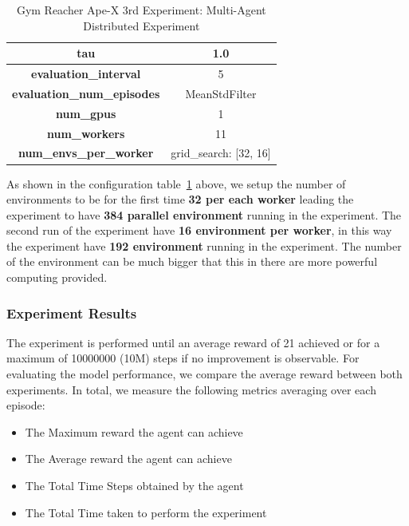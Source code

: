 \begin{table}[!htb]
\begin{tabular}{|c|l|l|c|l|l|}
		\multicolumn{3}{|c|}{\textbf{tau}}                                            & \multicolumn{3}{c|}{1.0}                                                             \\ \hline
		\multicolumn{3}{|c|}{\textbf{evaluation\_interval}}                           & \multicolumn{3}{c|}{5}                                                               \\ \hline
		\multicolumn{3}{|c|}{\textbf{evaluation\_num\_episodes}}                      & \multicolumn{3}{c|}{MeanStdFilter}                                                   \\ \hline
		\multicolumn{3}{|c|}{\cellcolor[HTML]{C0C0C0}\textbf{num\_gpus}}              & \multicolumn{3}{c|}{\cellcolor[HTML]{C0C0C0}1}                                       \\ \hline
		\multicolumn{3}{|c|}{\cellcolor[HTML]{C0C0C0}\textbf{num\_workers}}           & \multicolumn{3}{c|}{\cellcolor[HTML]{C0C0C0}11}                                      \\ \hline
		\multicolumn{3}{|c|}{\cellcolor[HTML]{C0C0C0}\textbf{num\_envs\_per\_worker}} & \multicolumn{3}{c|}{\cellcolor[HTML]{C0C0C0}grid\_search: [32, 16]}                  \\ \hline
	\end{tabular}
	\caption{Gym Reacher Ape-X 3rd Experiment: Multi-Agent Distributed Experiment}
	\label{tab:gym_reacher_apex_3rd_exp}
\end{table}

As shown in the configuration table~\ref{tab:gym_reacher_apex_3rd_exp} above, we setup the number of environments to be for the first time \textbf{32 per each worker} leading the experiment to have \textbf{384 parallel environment} running in the experiment. The second run of the experiment have \textbf{16 environment per worker}, in this way the experiment have \textbf{192 environment} running in the experiment. The number of the environment can be much bigger that this in there are more powerful computing provided.


\subsubsection{Experiment Results}

The experiment is performed until an average reward of 21 achieved or for a maximum of 10000000 (10M) steps if no improvement is observable. For evaluating the model performance, we compare the average reward between both experiments. In total, we measure the following metrics averaging over each episode:
\begin{itemize}
	\item The Maximum reward the agent can achieve
	\item The Average reward the agent can achieve
	\item The Total Time Steps obtained by the agent
	\item The Total Time taken to perform the experiment
\end{itemize}

